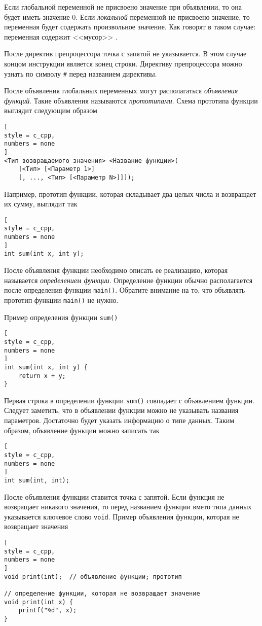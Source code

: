 \documentclass[%
	11pt,
	a4paper,
	utf8,
		]{article}
\begin{document}
Если глобальной переменной не присвоено значение при объявлении, то она будет иметь значение 0. Если \emph{локальной} переменной не присвоено значение, то переменная будет содержать {\color{red}произвольное значение}. Как говорят в таком случае: переменная содержит <<мусор>> \cite[]{prokhorenok-prog-c:2020}.

После директив препроцессора точка с запятой не указывается. В этом случае концом инструкции является конец строки. Директиву препроцессора можно узнать по символу \verb|#| перед названием директивы. 

После объявления глобальных переменных могут располагаться \emph{объявления функций}. Такие объявления называются \emph{прототипами}. Схема прототипа функции выглядит следующим образом
\begin{lstlisting}[
style = c_cpp,
numbers = none
]
<Тип возвращаемого значения> <Название функции>(
    [<Тип> [<Параметр 1>]
    [, ..., <Тип> [<Параметр N>]]]);
\end{lstlisting}

Например, прототип функции, которая складывает два целых числа и возвращает их сумму, выглядит так
\begin{lstlisting}[
style = c_cpp,
numbers = none
]
int sum(int x, int y);
\end{lstlisting}

После объявления функции необходимо описать ее реализацию, которая называется \emph{определением функции}. Определение функции обычно располагается после определения функции \verb|main()|. Обратите внимание на то, что объявлять прототип функции \verb|main()| не нужно.

Пример определения функции \verb|sum()|
\begin{lstlisting}[
style = c_cpp,
numbers = none
]
int sum(int x, int y) {
    return x + y;
}
\end{lstlisting}

Первая строка в определении функции \verb|sum()| совпадает с объявлением функции. Следует заметить, что в объявлении функции можно не указывать названия параметров. Достаточно будет указать информацию о типе данных. Таким образом, объявление функции можно записать так
\begin{lstlisting}[
style = c_cpp,
numbers = none
]
int sum(int, int);
\end{lstlisting}

После объявления функции ставится точка с запятой. Если функция не возвращает никакого значения, то перед названием функции вмето типа данных указывается ключевое слово \verb|void|. Пример объявления функции, которая не возвращает значения
\begin{lstlisting}[
style = c_cpp,
numbers = none
]
void print(int);  // объявление функции; прототип

// определение функции, которая не возвращает значение
void print(int x) {
    printf("%d", x);
}
\end{lstlisting}
\end{document}
